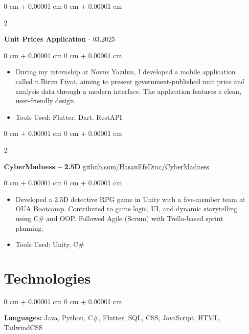 \documentclass[10pt, letterpaper]{article}
\newenvironment{highlights}{
    \begin{itemize}[
        topsep=0.10 cm,
        parsep=0.10 cm,
        partopsep=0pt,
        itemsep=0pt,
        leftmargin=0 cm + 10pt
    ]
}{
    \end{itemize}
} %
\newenvironment{onecolentry}{
    \begin{adjustwidth}{
        0 cm + 0.00001 cm
    }{
        0 cm + 0.00001 cm
    }
}{
    \end{adjustwidth}
} %
\newenvironment{twocolentry}[2][]{
    \onecolentry
    \def\secondColumn{#2}
    \setcolumnwidth{\fill, 4.5 cm}
    \begin{paracol}{2}
}{
    \switchcolumn \raggedleft \secondColumn
    \end{paracol}
    \endonecolentry
} %
\begin{document}
    \vspace{0.2 cm}

    \begin{twocolentry}{
        03.2025 - 03.2025
    }
        \textbf{Unit Prices Application}\end{twocolentry}

    \vspace{0.10 cm}
    \begin{onecolentry}
        \begin{highlights}
            \item During my internship at Novus Yazılım, I developed a mobile application called n.Birim Fiyat, aiming to present government-published unit price and analysis data through a modern interface. The application features a clean, user-friendly design.
            \item Tools Used: Flutter, Dart, RestAPI
        \end{highlights}
    \end{onecolentry}

    \vspace{0.2 cm}

    \begin{twocolentry}{
        \href{https://github.com/HasanEfeDinc/CyberMadness}{github.com/HasanEfeDinc/CyberMadness}
    }
        \textbf{CyberMadness – 2.5D}\end{twocolentry}

    \vspace{0.10 cm}
    \begin{onecolentry}
        \begin{highlights}
            \item Developed a 2.5D detective RPG game in Unity with a five-member team at OUA Bootcamp. Contributed to game logic, UI, and dynamic storytelling using C# and OOP. Followed Agile (Scrum) with Trello-based sprint planning.
            \item Tools Used: Unity, C#
        \end{highlights}
    \end{onecolentry}


    \section{Technologies}

    \begin{onecolentry}
        \textbf{Languages:} Java, Python, C\#, Flutter, SQL, CSS, JavaScript, HTML, TailwindCSS
    \end{onecolentry}
\end{document}
